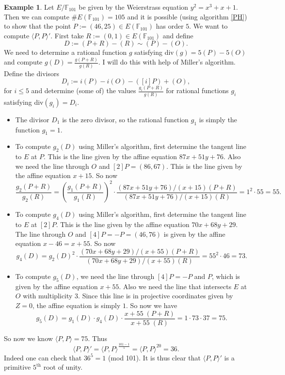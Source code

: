 \documentclass{article}
\numberwithin{equation}{section}
\theoremstyle{definition}
\newtheorem{example}[theorem]{Example}
\newcommand{\FF}[1]{{\mathbb F}_{#1}} %
\begin{document}
\begin{example}
Let $E/\FF{101}$ be given by the Weierstrass equation $y^2=x^3+x+1$. Then we can compute $\#E(\FF{101})=105$ and it is possible (using algorithm \ref{PH}) to show that the point $P:=(46,25) \in E(\FF{101})$ has order $5$. We want to compute $\langle P,P \rangle '$. First take $R:=(0,1) \in E(\FF{101})$ and define $$D:=(P+R)-(R) \sim (P)-(O).$$ We need to determine a rational function $g$ satisfying div$(g)=5(P)-5(O)$ and compute $g(D)=\frac{g(P+R)}{g(R)}$. I will do this with help of Miller's algorithm. Define the divisors $$D_i:=i(P)-i(O)-([i]P)+(O),$$ for $i \leq 5$ and determine (some of) the values $\frac{g_i(P+R)}{g(R)}$ for rational functions $g_i$ satisfying div$(g_i)=D_i$. 
\begin{itemize}
\item The divisor $D_1$ is the zero divisor, so the rational function $g_1$ is simply the function $g_1=1$.
\item To compute $g_2(D)$ using Miller's algorithm, first determine the tangent line to $E$ at $P$. This is the line given by the affine equation $87x+51y+76$. Also we need the line through $O$ and $[2]P=(86,67)$. This is the line given by the affine equation $x+15$. So now $$\frac{g_2(P+R)}{g_2(R)}=\left(\frac{g_1(P+R)}{g_1(R)}\right)^2\cdot\frac{(87x+51y+76)/(x+15)(P+R)}{(87x+51y+76)/(x+15)(R)}=1^2\cdot 55=55.$$
\item To compute $g_4(D)$ using Miller's algorithm, first determine the tangent line to $E$ at $[2]P$. This is the line given by the affine equation $70x+68y+29$. The line through $O$ and $[4]P=-P=(46,76)$ is given by the affine equation $x-46=x+55$. So now $$g_4(D)=g_2(D)^2\cdot\frac{(70x+68y+29)/(x+55)(P+R)}{(70x+68y+29)/(x+55)(R)}=55^2 \cdot 46=73.$$
\item To compute $g_5(D)$, we need the line through $[4]P=-P$ and $P$, which is given by the affine equation $x+55$. Also we need the line that intersects $E$ at $O$ with multiplicity $3$. Since this line is in projective coordinates given by $Z=0$, the affine equation is simply $1$. So now we have $$g_5(D)=g_1(D)\cdot g_4(D)\cdot \frac{x+55 \;(P+R)}{x+55 \;(R)}=1\cdot 73 \cdot 37 = 75.$$
\end{itemize}
So now we know $\langle P,P \rangle = 75$. Thus $$\langle P,P \rangle'=\langle P,P \rangle ^{\frac{101-1}{5}}=\langle P,P \rangle ^{20} = 36.$$ Indeed one can check that $36^5 = 1$ (mod 101). It is thus clear that $\langle P,P \rangle'$ is a primitive $5^\text{th}$ root of unity. 
\end{example}
\end{document}
